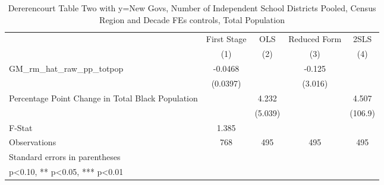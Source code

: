 \begin{table}[htbp]\centering
\def\sym#1{\ifmmode^{#1}\else\(^{#1}\)\fi}
\caption{Dererencourt Table Two with y=New Govs, Number of Independent School Districts  Pooled, Census Region and Decade FEs controls, Total Population}
\begin{tabular}{l*{4}{c}}
\toprule
                    & First Stage   &         OLS   &Reduced Form   &        2SLS   \\
                    &\multicolumn{1}{c}{(1)}   &\multicolumn{1}{c}{(2)}   &\multicolumn{1}{c}{(3)}   &\multicolumn{1}{c}{(4)}   \\
\midrule
GM\_rm\_hat\_raw\_pp\_totpop&     -0.0468   &               &      -0.125   &               \\
                    &    (0.0397)   &               &     (3.016)   &               \\
\addlinespace
Percentage Point Change in Total Black Population&               &       4.232   &               &       4.507   \\
                    &               &     (5.039)   &               &     (106.9)   \\
\midrule
F-Stat              &       1.385   &               &               &               \\
Observations        &         768   &         495   &         495   &         495   \\
\bottomrule
\multicolumn{5}{l}{\footnotesize Standard errors in parentheses}\\
\multicolumn{5}{l}{\footnotesize * p<0.10, ** p<0.05, *** p<0.01}\\
\end{tabular}
\end{table}
